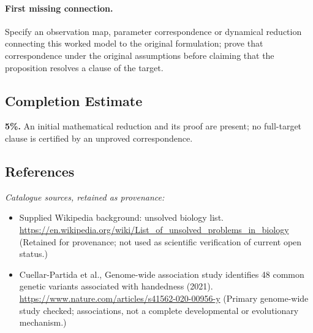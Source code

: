 \documentclass[11pt]{article}
\begin{document}
\paragraph{First missing connection.} Specify an observation map, parameter correspondence or dynamical reduction connecting this worked model to the original formulation; prove that correspondence under the original assumptions before claiming that the proposition resolves a clause of the target.
\subsection{Completion Estimate}
\textbf{5\%.} An initial mathematical reduction and its proof are present; no full-target clause is certified by an unproved correspondence.
\subsection{References}
\noindent\emph{Catalogue sources, retained as provenance:}
\begin{itemize}
\item Supplied Wikipedia background: unsolved biology list. \url{https://en.wikipedia.org/wiki/List_of_unsolved_problems_in_biology} (Retained for provenance; not used as scientific verification of current open status.)
\item Cuellar-Partida et al., Genome-wide association study identifies 48 common genetic variants associated with handedness (2021). \url{https://www.nature.com/articles/s41562-020-00956-y} (Primary genome-wide study checked; associations, not a complete developmental or evolutionary mechanism.)
\end{itemize}
\clearpage


\appendix
\end{document}
